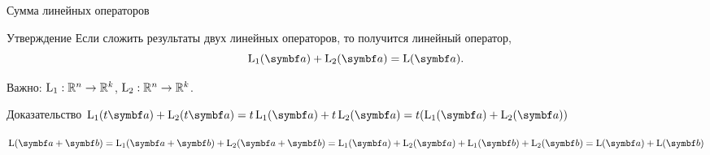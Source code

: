 \begin{frame}{Сумма линейных операторов}




\begin{block}{Утверждение}
Если сложить результаты двух линейных операторов, 
	то получится линейный оператор, 
\[
	\LL_1(\ba) + \LL_2(\ba) = \LL(\ba).
\]
\end{block}
\pause
Важно: $\operatorname{L}_1 : \mathbb{R}^n \to \mathbb{R}^k$, $\operatorname{L}_2 : \mathbb{R}^n \to \mathbb{R}^k$.

\pause
\begin{block}{Доказательство}
$\LL_1(t\ba) + \LL_2(t\ba) = t\LL_1(\ba) + t\LL_2(\ba)=t(\LL_1(\ba) + \LL_2(\ba))$
\pause

$\LL(\ba + \bb) = \LL_1(\ba + \bb) + \LL_2(\ba + \bb) = \LL_1(\ba ) + \LL_2(\ba ) + \LL_1( \bb) + \LL_2(\bb) = \LL(\ba) + \LL(\bb)$
\end{block}

    

\end{frame}

    